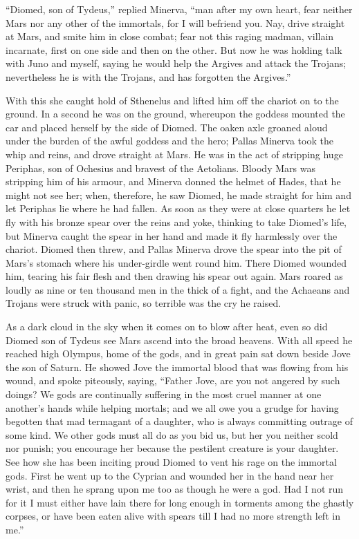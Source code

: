 “Diomed, son of Tydeus,” replied Minerva, “man after my own heart, fear
neither Mars nor any other of the immortals, for I will befriend you. Nay,
drive straight at Mars, and smite him in close combat; fear not this
raging madman, villain incarnate, first on one side and then on the other.
But now he was holding talk with Juno and myself, saying he would help the
Argives and attack the Trojans; nevertheless he is with the Trojans, and
has forgotten the Argives.”

With this she caught hold of Sthenelus and lifted him off the chariot on
to the ground. In a second he was on the ground, whereupon the goddess
mounted the car and placed herself by the side of Diomed. The oaken axle
groaned aloud under the burden of the awful goddess and the hero; Pallas
Minerva took the whip and reins, and drove straight at Mars. He was in the
act of stripping huge Periphas, son of Ochesius and bravest of the
Aetolians. Bloody Mars was stripping him of his armour, and Minerva donned
the helmet of Hades, that he might not see her; when, therefore, he saw
Diomed, he made straight for him and let Periphas lie where he had fallen.
As soon as they were at close quarters he let fly with his bronze spear
over the reins and yoke, thinking to take Diomed’s life, but Minerva
caught the spear in her hand and made it fly harmlessly over the chariot.
Diomed then threw, and Pallas Minerva drove the spear into the pit of
Mars’s stomach where his under-girdle went round him. There Diomed wounded
him, tearing his fair flesh and then drawing his spear out again. Mars
roared as loudly as nine or ten thousand men in the thick of a fight, and
the Achaeans and Trojans were struck with panic, so terrible was the cry
he raised.

As a dark cloud in the sky when it comes on to blow after heat, even so
did Diomed son of Tydeus see Mars ascend into the broad heavens. With all
speed he reached high Olympus, home of the gods, and in great pain sat
down beside Jove the son of Saturn. He showed Jove the immortal blood that
was flowing from his wound, and spoke piteously, saying, “Father Jove, are
you not angered by such doings? We gods are continually suffering in the
most cruel manner at one another’s hands while helping mortals; and we all
owe you a grudge for having begotten that mad termagant of a daughter, who
is always committing outrage of some kind. We other gods must all do as
you bid us, but her you neither scold nor punish; you encourage her
because the pestilent creature is your daughter. See how she has been
inciting proud Diomed to vent his rage on the immortal gods. First he went
up to the Cyprian and wounded her in the hand near her wrist, and then he
sprang upon me too as though he were a god. Had I not run for it I must
either have lain there for long enough in torments among the ghastly
corpses, or have been eaten alive with spears till I had no more strength
left in me.”

